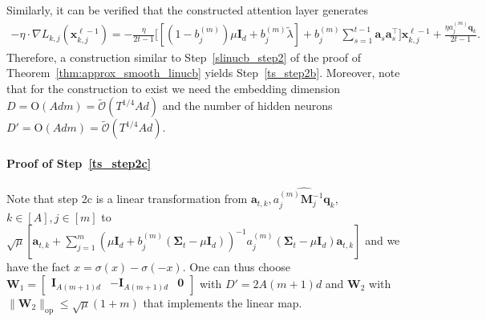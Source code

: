 \documentclass[10pt]{article}
\newcommand{\id}{\bI}
\newcommand{\lops}[1]{\|{#1}\|_{\mathrm{op}}}
\newcommand{\<}{\left\langle}
\renewcommand{\>}{\right\rangle}
\newcommand{\bzero}{{\mathbf 0}}
\newcommand{\Tpscov}{{{\mathbf\Sigma}}}
\newcommand{\prodeig}{{\mu}}
\newcommand{\intvec}{{\mathbf {q}}}
\newcommand{\intmat}{{\mathbf {M}}}
\newcommand{\tcO}{{\tilde{\mathcal O}}}
\newcommand{\hidden}{{D'}}
\newcommand{\conO}{{\mathrm{O}}}
\def\bI{{\mathbf I}}
\def\bW{{\mathbf W}}
\def\ba{{\mathbf a}}
\def\bx{{\mathbf x}}
\begin{document}
Similarly, it can be verified that the constructed attention layer generates 
\begin{align*}
  -\eta\cdot\nabla L_{k,j}(\bx_{k,j}^{\ell-1})=-\frac{\eta}{2t-1}\Big[ [(1-b_j^{(m)})\prodeig\id_d+b_j^{(m)}\tilde\lambda]+b_j^{(m)}\sum_{s=1}^{t-1}\ba_s\ba_s^\top \Big]\bx_{k,j}^{\ell-1}+\frac{\eta a_j^{(m)}\intvec_k}{2t-1}.
\end{align*} 
Therefore,  a  construction similar to  Step~\ref{slinucb_step2} of the proof of Theorem~\ref{thm:approx_smooth_linucb} yields Step~\ref{ts_step2b}. Moreover, note that for the construction to exist  we need the embedding dimension  $D=\conO(Adm)=\tcO(T^{1/4}Ad)$ and the number of hidden neurons $\hidden=\conO(Adm)=\tcO(T^{1/4}Ad)$.

\paragraph{Proof of Step~\ref{ts_step2c}}
Note that step 2c is a linear transformation from $\ba_{t,k},\widehat{a_j^{(m)}\intmat_j^{-1}\intvec_k}$, $k\in[A],j\in[m]$ to  $\sqrt{\prodeig} [\ba_{t,k}+\sum_{j=1}^m ({\prodeig}\id_d+{b_j^{(m)}(\Tpscov_t-\prodeig \id_d)})^{-1}{a_j^{(m)}(\Tpscov_t-\prodeig \id_d)\ba_{t,k}} ]$ and we have the fact $x=\sigma(x)-\sigma(-x)$. One can thus choose $\bW_1=\begin{bmatrix}
    \id_{A(m+1)d} & -\id_{A(m+1)d}&\bzero
\end{bmatrix}$ with $\hidden=2A(m+1)d$ and $\bW_2$ with $\lops{\bW_2}\leq \sqrt{\prodeig}(1+m)$ that implements the linear map.
\end{document}
